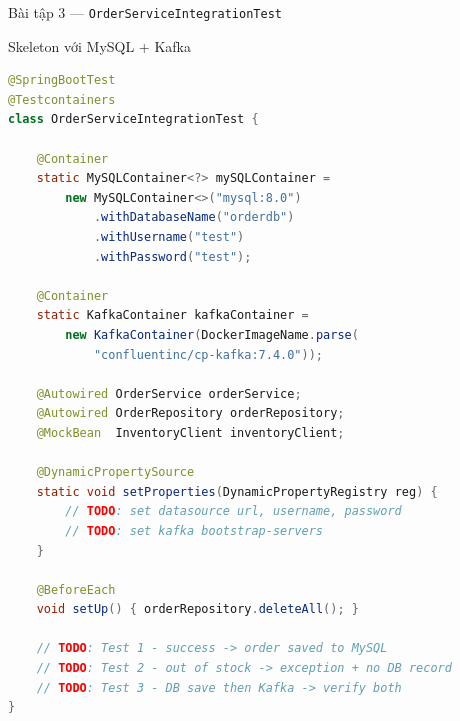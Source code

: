 \documentclass[aspectratio=169,10pt]{beamer}
\begin{document}
\begin{frame}[fragile]{Bài tập 3 --- \texttt{OrderServiceIntegrationTest}}
  \begin{block}{Skeleton với MySQL + Kafka}
\begin{lstlisting}[language=Java]
@SpringBootTest
@Testcontainers
class OrderServiceIntegrationTest {

    @Container
    static MySQLContainer<?> mySQLContainer =
        new MySQLContainer<>("mysql:8.0")
            .withDatabaseName("orderdb")
            .withUsername("test")
            .withPassword("test");

    @Container
    static KafkaContainer kafkaContainer =
        new KafkaContainer(DockerImageName.parse(
            "confluentinc/cp-kafka:7.4.0"));

    @Autowired OrderService orderService;
    @Autowired OrderRepository orderRepository;
    @MockBean  InventoryClient inventoryClient;

    @DynamicPropertySource
    static void setProperties(DynamicPropertyRegistry reg) {
        // TODO: set datasource url, username, password
        // TODO: set kafka bootstrap-servers
    }

    @BeforeEach
    void setUp() { orderRepository.deleteAll(); }

    // TODO: Test 1 - success -> order saved to MySQL
    // TODO: Test 2 - out of stock -> exception + no DB record
    // TODO: Test 3 - DB save then Kafka -> verify both
}
\end{lstlisting}
  \end{block}
\end{frame}
\end{document}
